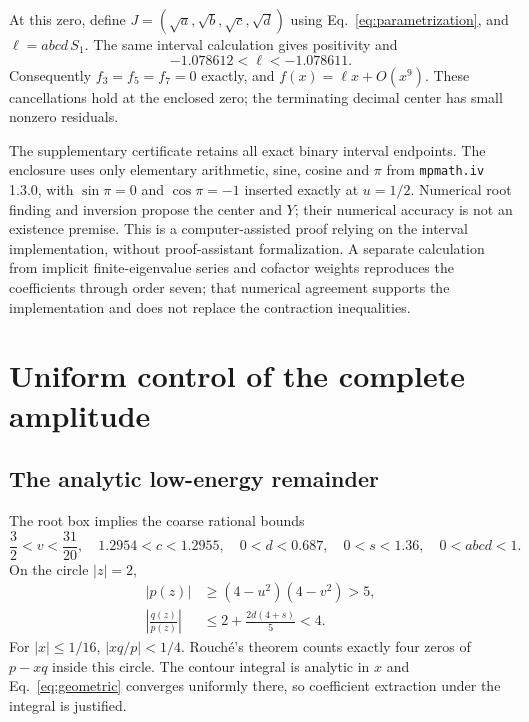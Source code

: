 \documentclass[11pt,a4paper]{article}
\numberwithin{equation}{section}
\begin{document}
At this zero, define $J=(\sqrt{a},\sqrt{b},\sqrt{c},\sqrt{d})$ using
Eq.~\eqref{eq:parametrization}, and $\ell=abcd\,S_1$.
The same interval calculation gives positivity and
\begin{equation}
 -1.078612<\ell<-1.078611.
 \label{eq:linear}
\end{equation}
Consequently $f_3=f_5=f_7=0$ exactly, and
$f(x)=\ell x+O(x^9)$. These cancellations hold at the enclosed zero;
the terminating decimal center has small nonzero residuals.

The supplementary certificate retains all exact binary interval endpoints.
The enclosure uses only elementary arithmetic, sine, cosine and $\pi$
from \texttt{mpmath.iv} 1.3.0, with $\sin\pi=0$ and $\cos\pi=-1$
inserted exactly at $u=1/2$. Numerical root finding and inversion propose
the center and $Y$; their numerical accuracy is not an existence premise.
This is a computer-assisted proof relying on the interval implementation,
without proof-assistant formalization. A separate calculation from implicit
finite-eigenvalue series and cofactor weights reproduces the coefficients
through order seven; that numerical agreement supports the implementation
and does not replace the contraction inequalities.

\section{Uniform control of the complete amplitude}\label{sec:bound}
\subsection{The analytic low-energy remainder}
The root box implies the coarse rational bounds
\begin{equation}
 \frac32<v<\frac{31}{20},\quad
 1.2954<c<1.2955,\quad 0<d<0.687,\quad
 0<s<1.36,\quad 0<abcd<1.
 \label{eq:outer}
\end{equation}
On the circle $|z|=2$,
\begin{align}
 |p(z)|&\ge(4-u^2)(4-v^2)>5,\nonumber\\
 \left|\frac{q(z)}{p(z)}\right|
 &\le 2+\frac{2d(4+s)}{5}<4.
 \label{eq:contour}
\end{align}
For $|x|\le1/16$, $|xq/p|<1/4$. Rouch\'e's theorem counts exactly
four zeros of $p-xq$ inside this circle. The contour integral is analytic
in $x$ and Eq.~\eqref{eq:geometric} converges uniformly there, so
coefficient extraction under the integral is justified.
\end{document}
